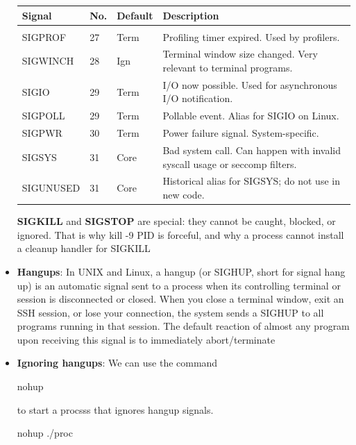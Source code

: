 \documentclass{report}
\begin{document}
\begin{itemize}
\begin{center}
\begin{tabularx}{\textwidth}{@{}lllX@{}}
                        \bottomrule
                    \end{tabularx}
                \end{center}
                \begin{center}
                    \begin{tabularx}{\textwidth}{@{}lllX@{}}
                        \toprule
                        \textbf{Signal}&	\textbf{No.}&	\textbf{Default}&	\textbf{Description} \\
                        \midrule\\[2ex]
                        SIGPROF	&27	&Term	&Profiling timer expired. Used by profilers.\\[2ex]
                        SIGWINCH	&28	&Ign	&Terminal window size changed. Very relevant to terminal programs.\\[2ex]
                        SIGIO	&29	&Term	&I/O now possible. Used for asynchronous I/O notification.\\[2ex]
                        SIGPOLL	&29	&Term	&Pollable event. Alias for SIGIO on Linux.\\[2ex]
                        SIGPWR	&30	&Term	&Power failure signal. System-specific.\\[2ex]
                        SIGSYS	&31	&Core	&Bad system call. Can happen with invalid syscall usage or seccomp filters.\\[2ex]
                        SIGUNUSED	&31	&Core	&Historical alias for SIGSYS; do not use in new code. \\
                        \bottomrule
                    \end{tabularx}
                \end{center}
                \textbf{SIGKILL} and \textbf{SIGSTOP} are special: they cannot be caught, blocked, or ignored. That is why kill -9 PID is forceful, and why a process cannot install a cleanup handler for SIGKILL
            \item \textbf{Hangups}: In UNIX and Linux, a hangup (or SIGHUP, short for signal hang up) is an automatic signal sent to a process when its controlling terminal or session is disconnected or closed.
                \bigbreak \noindent 
                When you close a terminal window, exit an SSH session, or lose your connection, the system sends a SIGHUP to all programs running in that session. The default reaction of almost any program upon receiving this signal is to immediately abort/terminate
            \item \textbf{Ignoring hangups}: We can use the command
                \bigbreak \noindent 
                \begin{bashcode}
                nohup 
                \end{bashcode}
                \bigbreak \noindent 
                to start a procsss that ignores hangup signals.
                \bigbreak \noindent 
                \begin{bashcode}
                nohup ./proc
                \end{bashcode}

        \end{itemize}
\end{document}
